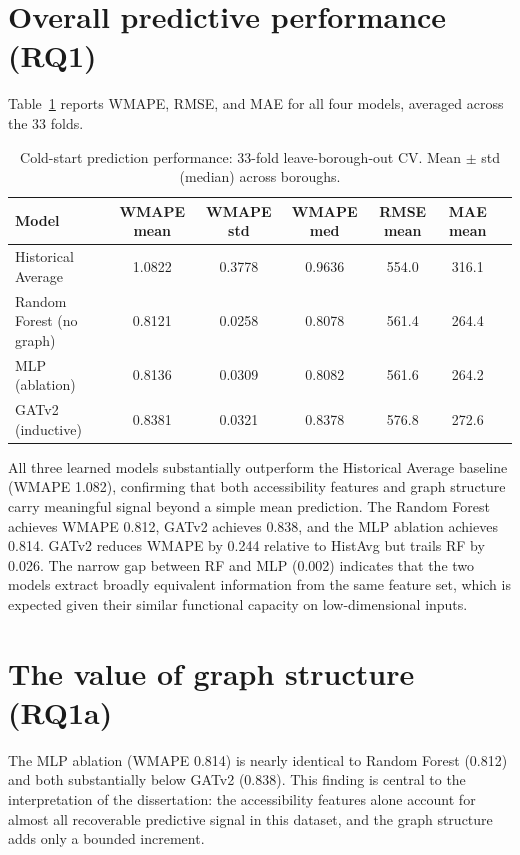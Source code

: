 \documentclass[12pt,a4paper]{report}
\begin{document}
\section{Overall predictive performance (RQ1)}
Table~\ref{tab:results} reports WMAPE, RMSE, and MAE for all four models,
averaged across the 33 folds.

\begin{table}[ht]
  \centering
  \caption{Cold-start prediction performance: 33-fold leave-borough-out CV.
           Mean $\pm$ std (median) across boroughs.}
  \label{tab:results}
  \begin{tabular}{lcccccc}
    \toprule
    Model & WMAPE mean & WMAPE std & WMAPE med & RMSE mean & MAE mean \\
    \midrule
    Historical Average       & 1.0822 & 0.3778 & 0.9636 & 554.0 & 316.1 \\
    Random Forest (no graph) & 0.8121 & 0.0258 & 0.8078 & 561.4 & 264.4 \\
    MLP (ablation)           & 0.8136 & 0.0309 & 0.8082 & 561.6 & 264.2 \\
    GATv2 (inductive)        & 0.8381 & 0.0321 & 0.8378 & 576.8 & 272.6 \\
    \bottomrule
  \end{tabular}
\end{table}

All three learned models substantially outperform the Historical Average
baseline (WMAPE 1.082), confirming that both accessibility features and graph
structure carry meaningful signal beyond a simple mean prediction. The
Random Forest achieves WMAPE 0.812, GATv2 achieves 0.838, and the MLP
ablation achieves 0.814. GATv2 reduces WMAPE by 0.244 relative to HistAvg
but trails RF by 0.026. The narrow gap between RF and MLP (0.002) indicates
that the two models extract broadly equivalent information from the same
feature set, which is expected given their similar functional capacity on
low-dimensional inputs.

\section{The value of graph structure (RQ1a)}
The MLP ablation (WMAPE 0.814) is nearly identical to Random Forest (0.812)
and both substantially below GATv2 (0.838). This finding is central to the
interpretation of the dissertation: the accessibility features alone account
for almost all recoverable predictive signal in this dataset, and the graph
structure adds only a bounded increment.
\end{document}
